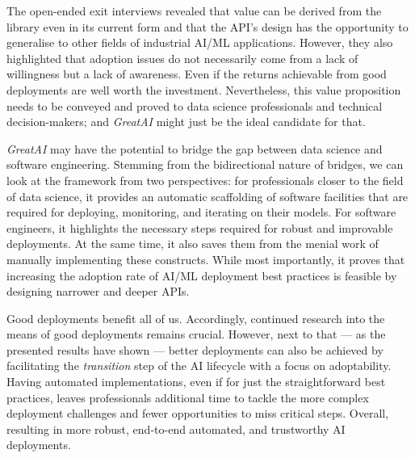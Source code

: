 The open-ended exit interviews revealed that value can be derived from the library even in its current form and that the API's design has the opportunity to generalise to other fields of industrial AI/ML applications. However, they also highlighted that adoption issues do not necessarily come from a lack of willingness but a lack of awareness. Even if the returns achievable from good deployments are well worth the investment. Nevertheless, this value proposition needs to be conveyed and proved to data science professionals and technical decision-makers; and \textit{GreatAI} might just be the ideal candidate for that.

\textit{GreatAI} may have the potential to bridge the gap between data science and software engineering. Stemming from the bidirectional nature of bridges, we can look at the framework from two perspectives: for professionals closer to the field of data science, it provides an automatic scaffolding of software facilities that are required for deploying, monitoring, and iterating on their models. For software engineers, it highlights the necessary steps required for robust and improvable deployments. At the same time, it also saves them from the menial work of manually implementing these constructs. While most importantly, it proves that increasing the adoption rate of AI/ML deployment best practices is feasible by designing narrower and deeper APIs.

Good deployments benefit all of us. Accordingly, continued research into the means of good deployments remains crucial. However, next to that --- as the presented results have shown --- better deployments can also be achieved by facilitating the \textit{transition} step of the AI lifecycle with a focus on adoptability. Having automated implementations, even if for just the straightforward best practices, leaves professionals additional time to tackle the more complex deployment challenges and fewer opportunities to miss critical steps. Overall, resulting in more robust, end-to-end automated, and trustworthy AI deployments.
